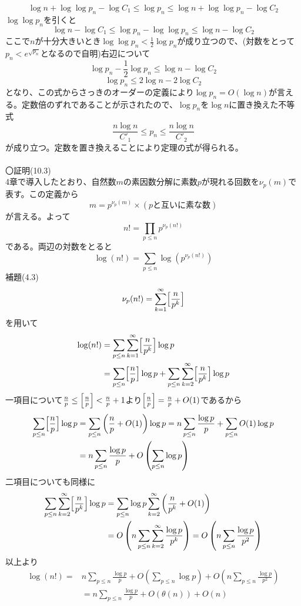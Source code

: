 \documentclass{jsarticle}
\begin{document}
\[\log n+\log\log p_{n}-\log C_{1}\leq\log p_{n}\leq\log n+\log\log p_{n}-\log C_{2}\]
\(\log\log p_{n}\)を引くと
\[\log n-\log C_{1}\leq\log p_{n}-\log\log p_{n}\leq\log n-\log C_{2}\]
ここで\(n\)が十分大きいとき\(\log\log p_{n}<\frac{1}{2}\log p_{n}\)が成り立つので、(対数をとって\(p_{n}<e^{\sqrt{p_{n}}}\)となるので自明)右辺について
\[\log p_{n}-\frac{1}{2}\log p_{n}\leq\log n-\log C_{2}\]
\[\log p_{n}\leq2\log n-2\log C_{2}\]
となり、この式からさっきのオーダーの定義により\(\log p_{n}=O(\log n)\)が言える。定数倍のずれであることが示されたので、\(\log p_{n}\)を\(\log n\)に置き換えた不等式
\[\frac{n\log n}{C'_{1}}\leq p_{n}\leq\frac{n\log n}{C'_{2}}\]
が成り立つ。定数を置き換えることにより定理の式が得られる。\\
\\
〇証明(10.3)\\
4章で導入したとおり、自然数\(m\)の素因数分解に素数\(p\)が現れる回数を\(\nu_{p}(m)\)で表す。この定義から
\[m=p^{\nu_{p}(m)}\times(pと互いに素な数)\]
が言える。よって
\[n!=\prod_{p\leq n}p^{\nu_{p}(n!)}\]
である。両辺の対数をとると
\[\log(n!)=\sum_{p\leq n}\log(p^{\nu_{p}(n!)})\]
補題(4.3)
\[\nu_{p}(n!)=\sum_{k=1}^{\infty}\Bigl[\frac{n}{p^{k}}\Bigr]\]
を用いて
\begin{align*}
\log(n!)&=\sum_{p\leq n}\sum_{k=1}^{\infty}\Bigl[\frac{n}{p^{k}}\Bigr]\log p\\
&=\sum_{p\leq n}\Bigl[\frac{n}{p}\Bigr]\log p+\sum_{p\leq n}\sum_{k=2}^{\infty}\Bigl[\frac{n}{p^{k}}\Bigr]\log p
\end{align*}
一項目について\(\frac{n}{p}\leq\Bigl[\frac{n}{p}\Bigr]<\frac{n}{p}+1\)より\(\Bigl[\frac{n}{p}\Bigr]=\frac{n}{p}+O(1)\)であるから\\
\begin{align*}
\sum_{p\leq n}\Bigl[\frac{n}{p}\Bigr]\log p&=\sum_{p\leq n}\left(\frac{n}{p}+O(1)\right)\log p=n\sum_{p\leq n}\frac{\log p}{p}+\sum_{p\leq n}O(1)\log p\\
&=n\sum_{p\leq n}\frac{\log p}{p}+O\left(\sum_{p\leq n}\log p\right)
\end{align*}
二項目についても同様に
\begin{align*}
\sum_{p\leq n}\sum_{k=2}^{\infty}\Bigl[\frac{n}{p^{k}}\Bigr]\log p&=\sum_{p\leq n}\log p\sum_{k=2}^{\infty}\left(\frac{n}{p^{k}}+O(1)\right)\\
&=O\left(n\sum_{p\leq n}\sum_{k=2}^{\infty}\frac{\log p}{p^{k}}\right)=O\left(n\sum_{p\leq n}\frac{\log p}{p^{2}}\right)
\end{align*}
以上より
\begin{align*}
\log(n!)=&n\sum_{p\leq n}\frac{\log p}{p}+O\left(\sum_{p\leq n}\log p\right)+O\left(n\sum_{p\leq n}\frac{\log p}{p^2}\right)\\
&=n\sum_{p\leq n}\frac{\log p}{p}+O\left(\theta(n)\right)+O(n)
\end{align*}
\end{document}
